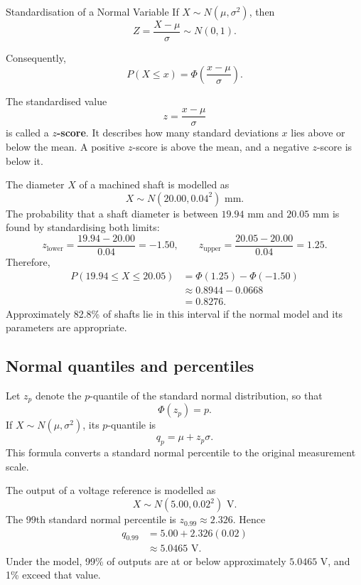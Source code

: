 \begin{theorem}{Standardisation of a Normal Variable}
If $X\sim N(\mu,\sigma^2)$, then
\[
    Z=\frac{X-\mu}{\sigma}\sim N(0,1).
\]
\end{theorem}

Consequently,
\[
    P(X\leq x)=
    \Phi\!\left(\frac{x-\mu}{\sigma}\right).
\]

The standardised value
\[
    z=\frac{x-\mu}{\sigma}
\]
is called a \textbf{$z$-score}. It describes how many standard deviations $x$ lies above or below the mean. A positive $z$-score is above the mean, and a negative $z$-score is below it.

\begin{example}\par
The diameter $X$ of a machined shaft is modelled as
\[
    X\sim N(20.00,0.04^2)\text{ mm}.
\]
The probability that a shaft diameter is between $19.94$ mm and $20.05$ mm is found by standardising both limits:
\[
    z_{\mathrm{lower}}=\frac{19.94-20.00}{0.04}=-1.50,
    \qquad
    z_{\mathrm{upper}}=\frac{20.05-20.00}{0.04}=1.25.
\]
Therefore,
\[
\begin{aligned}
P(19.94\leq X\leq20.05)
  &=\Phi(1.25)-\Phi(-1.50)\\
  &\approx0.8944-0.0668\\
  &=0.8276.
\end{aligned}
\]
Approximately 82.8\% of shafts lie in this interval if the normal model and its parameters are appropriate.
\end{example}

\subsection{Normal quantiles and percentiles}

Let $z_p$ denote the $p$-quantile of the standard normal distribution, so that
\[
    \Phi(z_p)=p.
\]
If $X\sim N(\mu,\sigma^2)$, its $p$-quantile is
\[
    q_p=\mu+z_p\sigma.
\]
This formula converts a standard normal percentile to the original measurement scale.

\begin{example}\par
The output of a voltage reference is modelled as
\[
    X\sim N(5.00,0.02^2)\text{ V}.
\]
The 99th standard normal percentile is $z_{0.99}\approx2.326$. Hence
\[
\begin{aligned}
q_{0.99}
  &=5.00+2.326(0.02)\\
  &\approx5.0465\text{ V}.
\end{aligned}
\]
Under the model, 99\% of outputs are at or below approximately $5.0465$ V, and 1\% exceed that value.
\end{example}

